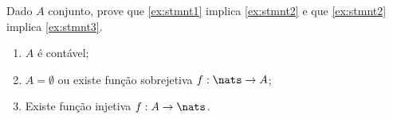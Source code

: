 \begin{exercise}
Dado $A$ conjunto, prove que \ref{ex:stmnt1} implica \ref{ex:stmnt2} e que \ref{ex:stmnt2} implica \ref{ex:stmnt3}.

\begin{enumerate}
	\item \label{ex:stmnt1} $A$ é contável;
	\item \label{ex:stmnt2} $A = \emptyset$ ou existe função sobrejetiva $f : \nats \to A$;
	\item \label{ex:stmnt3} Existe função injetiva $f: A \to \nats$.
\end{enumerate}
\end{exercise}
